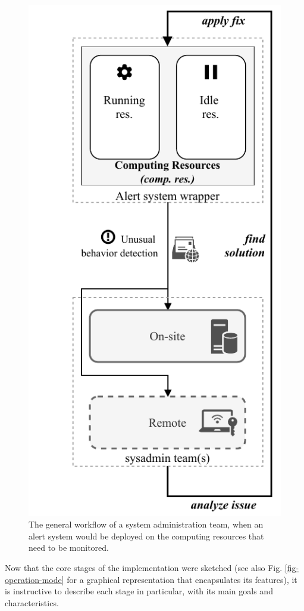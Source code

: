 \documentclass[conference]{IEEEtran}
\begin{document}
\begin{figure}[htbp]
    \includegraphics[scale=1.1]{figs/alert_system_improvements_v2.pdf}
    \caption{The general workflow of a system administration team, when an alert system would be deployed on the computing resources that need to be monitored.}
    \label{alert-system-general-workflow}
\end{figure}

\par Now that the core stages of the implementation were sketched (see also Fig. \ref{fig-operation-mode} for a graphical representation that encapsulates its features), it is instructive to describe each stage in particular, with its main goals and characteristics.
\end{document}
